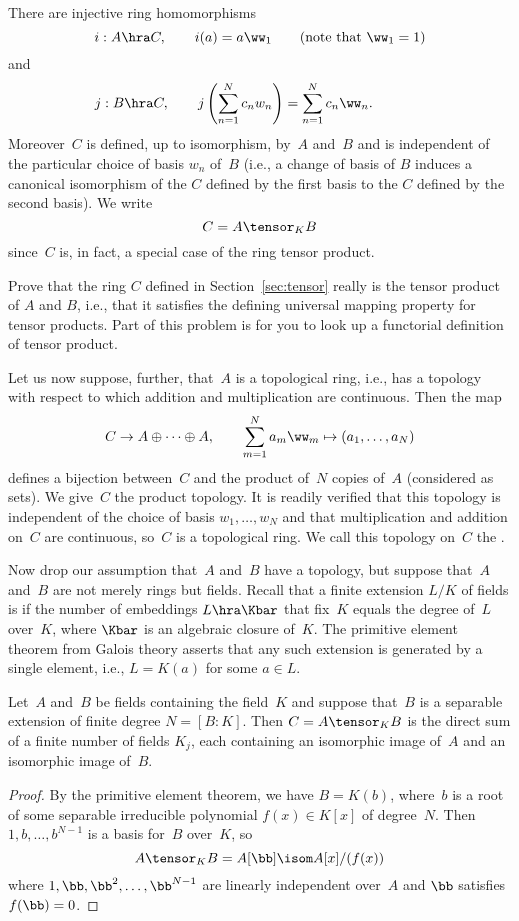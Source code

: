 \documentclass[11pt]{book}
\begin{document}
\begin{ch}
There are injective ring homomorphisms
$$
i:A\hra C, \qquad i(a) = a \ww_1  \qquad \text{(note that $\ww_1=1$)}
$$
and
$$
j:B\hra C, \qquad j\left(\sum_{n=1}^N c_n w_n\right) = \sum_{n=1}^N c_n \ww_n.
\qquad\quad\,\,\,\,\mbox{}
$$
Moreover~$C$ is defined, up to isomorphism, by~$A$ and~$B$ and is
independent of the particular choice of basis $w_n$ of~$B$ (i.e., a
change of basis of $B$ induces a canonical isomorphism of the $C$
defined by the first basis to the $C$ defined by the second basis).
We write
$$
  C = A\tensor_K B
$$
since~$C$ is, in fact, a special case of the ring tensor product.

\begin{exercise}\label{ex:normed2}
Prove that the ring $C$ defined in Section~\ref{sec:tensor} really is the tensor
product of $A$ and $B$, i.e., that it satisfies the defining universal
mapping property for tensor products.  Part of this problem is for you
to look up a functorial definition of tensor product.
\end{exercise}



Let us now suppose, further, that~$A$ is a topological ring, i.e., has
a topology with respect to which addition and multiplication are
continuous.  Then the map
$$
C\to A \oplus \cdots \oplus A,\qquad
  \sum_{m=1}^N a_m \ww_m \mapsto (a_1,\ldots, a_N)
$$
defines a bijection between~$C$ and the product of~$N$ copies of~$A$
(considered as sets). We give~$C$ the product topology.  It is readily
verified that this topology is independent of the choice of basis
$w_1, \ldots, w_N$ and that multiplication and addition on~$C$ are
continuous, so~$C$ is a topological ring.  We call this topology
on~$C$ the .

Now drop our assumption that~$A$ and~$B$ have a topology, but suppose
that~$A$ and~$B$ are not merely rings but fields.  Recall that a
finite extension $L/K$ of fields is  if the number of
embeddings $L\hra \Kbar$ that fix~$K$ equals the degree of~$L$
over~$K$, where $\Kbar$ is an algebraic closure of~$K$.  The primitive
element theorem from Galois theory asserts that any such extension is
generated by a single element, i.e., $L=K(a)$ for some $a\in L$.
\begin{lemma}\label{lem:tensor_prod}
  Let~$A$ and~$B$ be fields containing the field~$K$ and suppose
  that~$B$ is a separable extension of finite degree $N=[B:K]$.  Then
  $C=A\tensor_K B$ is the direct sum of a finite number of fields
  $K_j$, each containing an isomorphic image of~$A$ and an isomorphic
  image of~$B$.
\end{lemma}
\begin{proof}
  By the primitive element theorem, we have $B=K(b)$, where~$b$ is a
  root of some separable irreducible polynomial $f(x)\in K[x]$ of
  degree~$N$.  Then $1,b,\ldots, b^{N-1}$ is a basis
for~$B$ over~$K$, so
$$
  A\tensor_K B = A[\bb] \isom A[x]/(f(x))
$$
where $1,\bb,\bb^2,\ldots,\bb^{N-1}$ are
linearly independent over~$A$ and $\bb$ satisfies
$f(\bb)=0$.


\end{proof}
\end{ch}
\end{document}
